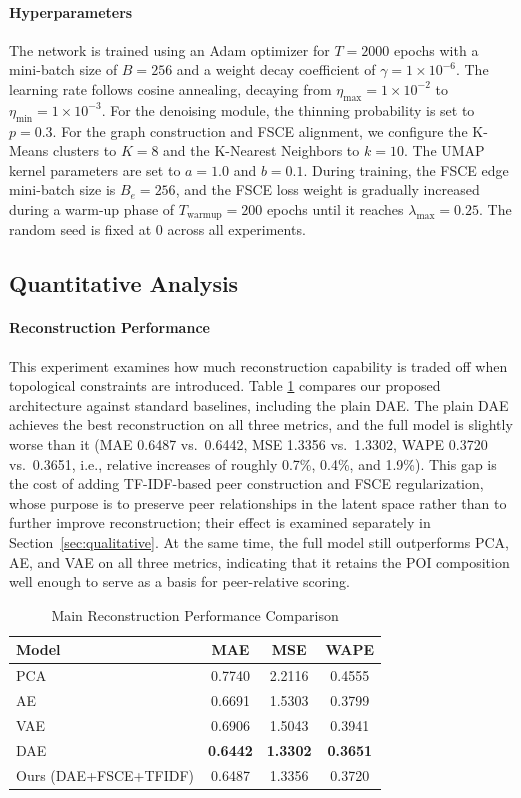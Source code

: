 \documentclass[sigconf]{acmart}
\begin{document}
\paragraph{Hyperparameters}
The network is trained using an Adam optimizer for $T=2000$ epochs with a mini-batch size of $B=256$ and a weight decay coefficient of $\gamma=1 \times 10^{-6}$. The learning rate follows cosine annealing, decaying from $\eta_{\max}=1 \times 10^{-2}$ to $\eta_{\min}=1 \times 10^{-3}$. For the denoising module, the thinning probability is set to $p=0.3$. For the graph construction and FSCE alignment, we configure the K-Means clusters to $K=8$ and the K-Nearest Neighbors to $k=10$. The UMAP kernel parameters are set to $a=1.0$ and $b=0.1$. During training, the FSCE edge mini-batch size is $B_e=256$, and the FSCE loss weight is gradually increased during a warm-up phase of $T_{\text{warmup}}=200$ epochs until it reaches $\lambda_{\max}=0.25$. The random seed is fixed at 0 across all experiments.


\subsection{Quantitative Analysis}

\paragraph{Reconstruction Performance}


This experiment examines how much reconstruction capability is traded off when topological constraints are introduced. Table \ref{tab:main_results} compares our proposed architecture against standard baselines, including the plain DAE. The plain DAE achieves the best reconstruction on all three metrics, and the full model is slightly worse than it (MAE 0.6487 vs.\ 0.6442, MSE 1.3356 vs.\ 1.3302, WAPE 0.3720 vs.\ 0.3651, i.e., relative increases of roughly 0.7\%, 0.4\%, and 1.9\%). This gap is the cost of adding TF-IDF-based peer construction and FSCE regularization, whose purpose is to preserve peer relationships in the latent space rather than to further improve reconstruction; their effect is examined separately in Section~\ref{sec:qualitative}. At the same time, the full model still outperforms PCA, AE, and VAE on all three metrics, indicating that it retains the POI composition well enough to serve as a basis for peer-relative scoring.


\begin{table}[h]
\centering
\caption{Main Reconstruction Performance Comparison}
\label{tab:main_results}
\begin{tabular}{p{4.5cm}ccc}
\toprule
Model & MAE & MSE & WAPE \\
\midrule
PCA & 0.7740 & 2.2116 & 0.4555 \\
AE & 0.6691 & 1.5303 & 0.3799 \\
VAE & 0.6906 & 1.5043 & 0.3941 \\
DAE & \textbf{0.6442} & \textbf{1.3302} & \textbf{0.3651} \\
\midrule
Ours (DAE+FSCE+TFIDF) & 0.6487 & 1.3356 & 0.3720 \\
\bottomrule
\end{tabular}
\end{table}
\end{document}
